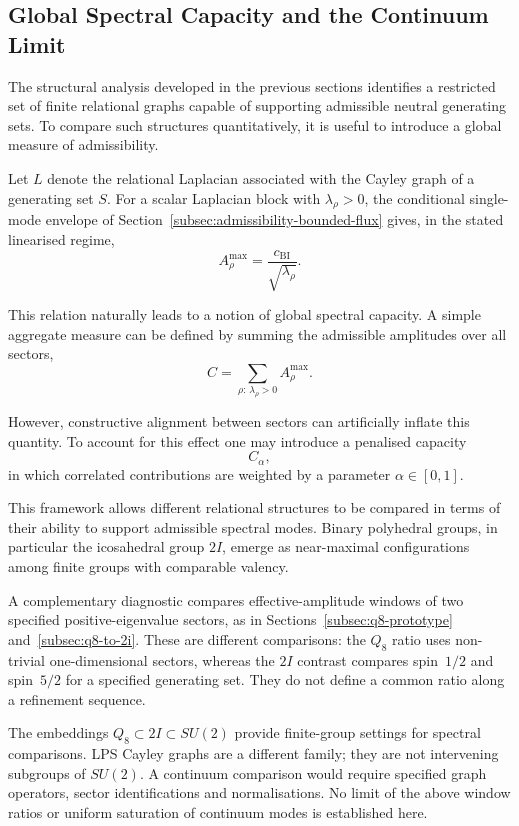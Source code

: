\subsection{Global Spectral Capacity and the Continuum Limit}
  \label{subsec:spectral-capacity}

  The structural analysis developed in the previous sections identifies a
  restricted set of finite relational graphs capable of supporting admissible
  neutral generating sets.
  To compare such structures quantitatively, it is useful to introduce a
  global measure of admissibility.

  Let $L$ denote the relational Laplacian associated with the Cayley graph of
  a generating set $S$.
  For a scalar Laplacian block with $\lambda_\rho>0$, the conditional single-mode envelope of
  Section~\ref{subsec:admissibility-bounded-flux} gives, in the stated linearised regime,
  \[
    A_\rho^{\max} = \frac{c_{\mathrm{BI}}}{\sqrt{\lambda_\rho}} .
  \]

  This relation naturally leads to a notion of global spectral capacity.
  A simple aggregate measure can be defined by summing the admissible
  amplitudes over all sectors,
  \begin{equation}
    C = \sum_{\rho:\,\lambda_\rho>0} A_\rho^{\max}.
  \end{equation}

  However, constructive alignment between sectors can artificially inflate
  this quantity.
  To account for this effect one may introduce a penalised capacity
  \[
    C_\alpha,
  \]
  in which correlated contributions are weighted by a parameter
  $\alpha \in [0,1]$.

  This framework allows different relational structures to be compared in
  terms of their ability to support admissible spectral modes.
  Binary polyhedral groups, in particular the icosahedral group $2I$, emerge
  as near-maximal configurations among finite groups with comparable
  valency.

  A complementary diagnostic compares effective-amplitude windows of two specified positive-eigenvalue
  sectors, as in Sections~\ref{subsec:q8-prototype} and~\ref{subsec:q8-to-2i}.
  These are different comparisons: the $Q_8$ ratio uses non-trivial one-dimensional sectors,
  whereas the $2I$ contrast compares spin~$1/2$ and spin~$5/2$ for a specified generating set.
  They do not define a common ratio along a refinement sequence.

  The embeddings $Q_8\subset2I\subset SU(2)$ provide finite-group settings for spectral comparisons.
  LPS Cayley graphs are a different family; they are not intervening subgroups of $SU(2)$.
  A continuum comparison would require specified graph operators, sector identifications and normalisations.
  No limit of the above window ratios or uniform saturation of continuum modes is established here.
